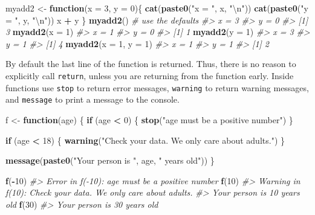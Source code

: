 \documentclass[]{book}
\newenvironment{Shaded}{\begin{snugshade}}{\end{snugshade}}
\newcommand{\KeywordTok}[1]{\textcolor[rgb]{0.13,0.29,0.53}{\textbf{#1}}}
\newcommand{\DataTypeTok}[1]{\textcolor[rgb]{0.13,0.29,0.53}{#1}}
\newcommand{\DecValTok}[1]{\textcolor[rgb]{0.00,0.00,0.81}{#1}}
\newcommand{\CharTok}[1]{\textcolor[rgb]{0.31,0.60,0.02}{#1}}
\newcommand{\StringTok}[1]{\textcolor[rgb]{0.31,0.60,0.02}{#1}}
\newcommand{\CommentTok}[1]{\textcolor[rgb]{0.56,0.35,0.01}{\textit{#1}}}
\newcommand{\ControlFlowTok}[1]{\textcolor[rgb]{0.13,0.29,0.53}{\textbf{#1}}}
\newcommand{\OperatorTok}[1]{\textcolor[rgb]{0.81,0.36,0.00}{\textbf{#1}}}
\newcommand{\NormalTok}[1]{#1}
\begin{document}
\begin{Shaded}
\begin{Highlighting}[]
\NormalTok{myadd2 <-}\StringTok{ }\ControlFlowTok{function}\NormalTok{(}\DataTypeTok{x =} \DecValTok{3}\NormalTok{, }\DataTypeTok{y =} \DecValTok{0}\NormalTok{)\{}
  \KeywordTok{cat}\NormalTok{(}\KeywordTok{paste0}\NormalTok{(}\StringTok{"x = "}\NormalTok{, x, }\StringTok{"}\CharTok{\textbackslash{}n}\StringTok{"}\NormalTok{))}
  \KeywordTok{cat}\NormalTok{(}\KeywordTok{paste0}\NormalTok{(}\StringTok{"y = "}\NormalTok{, y, }\StringTok{"}\CharTok{\textbackslash{}n}\StringTok{"}\NormalTok{))}
\NormalTok{  x }\OperatorTok{+}\StringTok{ }\NormalTok{y}
\NormalTok{\}}
\KeywordTok{myadd2}\NormalTok{()              }\CommentTok{# use the defaults}
\CommentTok{#> x = 3}
\CommentTok{#> y = 0}
\CommentTok{#> [1] 3}
\KeywordTok{myadd2}\NormalTok{(}\DataTypeTok{x =} \DecValTok{1}\NormalTok{)}
\CommentTok{#> x = 1}
\CommentTok{#> y = 0}
\CommentTok{#> [1] 1}
\KeywordTok{myadd2}\NormalTok{(}\DataTypeTok{y =} \DecValTok{1}\NormalTok{)}
\CommentTok{#> x = 3}
\CommentTok{#> y = 1}
\CommentTok{#> [1] 4}
\KeywordTok{myadd2}\NormalTok{(}\DataTypeTok{x =} \DecValTok{1}\NormalTok{, }\DataTypeTok{y =} \DecValTok{1}\NormalTok{)}
\CommentTok{#> x = 1}
\CommentTok{#> y = 1}
\CommentTok{#> [1] 2}
\end{Highlighting}
\end{Shaded}

By default the last line of the function is returned. Thus, there is no
reason to explicitly call \texttt{return}, unless you are returning from
the function early. Inside functions use \texttt{stop} to return error
messages, \texttt{warning} to return warning messages, and
\texttt{message} to print a message to the console.

\begin{Shaded}
\begin{Highlighting}[]
\NormalTok{f <-}\StringTok{ }\ControlFlowTok{function}\NormalTok{(age) \{}
  \ControlFlowTok{if}\NormalTok{ (age }\OperatorTok{<}\StringTok{ }\DecValTok{0}\NormalTok{) \{}
    \KeywordTok{stop}\NormalTok{(}\StringTok{"age must be a positive number"}\NormalTok{)}
\NormalTok{  \}}
  
  \ControlFlowTok{if}\NormalTok{ (age }\OperatorTok{<}\StringTok{ }\DecValTok{18}\NormalTok{) \{}
    \KeywordTok{warning}\NormalTok{(}\StringTok{"Check your data.  We only care about adults."}\NormalTok{)}
\NormalTok{  \}}
  
  \KeywordTok{message}\NormalTok{(}\KeywordTok{paste0}\NormalTok{(}\StringTok{"Your person is "}\NormalTok{, age, }\StringTok{" years old"}\NormalTok{))}
\NormalTok{\}}

\KeywordTok{f}\NormalTok{(}\OperatorTok{-}\DecValTok{10}\NormalTok{)}
\CommentTok{#> Error in f(-10): age must be a positive number}
\KeywordTok{f}\NormalTok{(}\DecValTok{10}\NormalTok{)}
\CommentTok{#> Warning in f(10): Check your data. We only care about adults.}
\CommentTok{#> Your person is 10 years old}
\KeywordTok{f}\NormalTok{(}\DecValTok{30}\NormalTok{)}
\CommentTok{#> Your person is 30 years old}
\end{Highlighting}
\end{Shaded}
\end{document}

